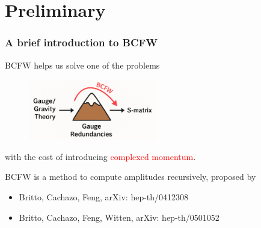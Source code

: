 \documentclass{beamer}
\begin{document}
\section{Preliminary}
\begin{frame}
    \frametitle{A brief introduction to BCFW}
BCFW helps us solve one of the problems
\vspace{-1em}
\begin{figure}
    \centering
    \includegraphics[width=0.5\textwidth]{BCFW.png}
\end{figure}
\vspace{-1em}
with the cost of introducing \textcolor{red}{complexed momentum}.

BCFW is a method to compute amplitudes recursively, proposed by 
\begin{itemize}
    \item Britto, Cachazo, Feng, arXiv: hep-th/0412308
    \item Britto, Cachazo, Feng, Witten, arXiv: hep-th/0501052

\end{itemize}
 


\begin{center}
    

 \begin{tikzpicture}[x=0.75pt,y=0.75pt,yscale=-1,xscale=1]
 

\end{tikzpicture}
\end{center}
\end{frame}
\end{document}
